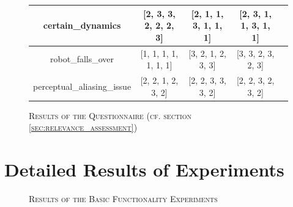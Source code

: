 \documentclass[english, master, utf8]{base/thesis_KBS}
\begin{document}
\begin{appendices}
\begin{figure}[H]
{\begin{tabular}{| c | c | c | c | c |}
            certain\_dynamics & [2, 3, 3, 2, 2, 2, 3] & [2, 1, 1, 3, 1, 1, 1] & [2, 3, 1, 1, 3, 1, 1] \\ \hline
            robot\_falls\_over & [1, 1, 1, 1, 1, 1, 1] & [3, 2, 1, 2, 3, 3] & [3, 3, 2, 3, 2, 3] \\ \hline
            perceptual\_aliasing\_issue & [2, 2, 1, 2, 3, 2] & [2, 2, 3, 3, 3, 2] & [2, 2, 3, 2, 3, 2] \\ \hline
        \end{tabular}}
    \caption{\textsc{Results of the Questionnaire (cf. section \ref{sec:relevance_assessment})}}
    \label{fig:detailed_res}
    \end{figure}

    \chapter{Detailed Results of Experiments}
    \label{sec:detailed_experiments_results}

    \begin{figure}[H]
        \centering
    \caption{\textsc{Results of the Basic Functionality Experiments}}
    \label{fig:detailed_functionality_res}
    \end{figure}


\end{appendices}
\end{document}
